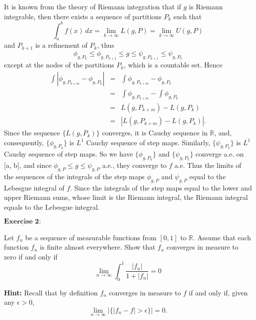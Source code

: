 \documentclass[12pt,a4paper]{ctexart}
\begin{document}
It is known from the theory of Riemann integration that if $g$ is Riemann integrable, then there exists a sequence of partitions $P_{k}$ such that
\begin{equation*}
    \int_{a}^{b} f(x) \, d x = \lim_{k \to \infty} L(g, P) = \lim_{k \to \infty} U(g, P)
\end{equation*}
and $P_{k+1}$ is a refinement of $P_{k}$, thus
\begin{equation*}
    \phi_{g, P_{k}} \leq \phi_{g, P_{k+1}}  \leq g \leq \psi_{g, P_{k+1}} \leq \psi_{g, P_{k}} 
\end{equation*}
except at the nodes of the partitions $P_{k}$, which is a countable set. Hence
\begin{eqnarray*}
    \int |\phi_{g, P_{k+m}} - \phi_{g, P_{k}} | & = & \int \phi_{g, P_{k+m}} - \phi_{g, P_{k}}   \\
    & = & \int \phi_{g, P_{k+m}} - \int \phi_{g, P_{k}}  \\
    & = & L(g, P_{k+m}) - L(g, P_{k}) \\
    & = & |L(g, P_{k+m}) - L(g, P_{k})|.
\end{eqnarray*}
Since the sequence $\{ L (g, P_{k}) \}$ converges, it is Cauchy sequence in $\mathbb{R}$, and, consequently, $\{\phi_{g, P_{k}} \}$ is $L^{1}$ Cauchy sequence of step maps. Similarly,  $\{\psi_{g, P_{k}} \}$ is $L^{1}$ Cauchy sequence of step maps. So we have $\{\phi_{g, P_{k}} \}$ and $\{\psi_{g, P_{k}} \}$ converge a.e. on [a, b], and since $\phi_{g, P} \leq g \leq \psi_{g, P}$ a.e., they converge to $f$ a.e. Thus the limits of the sequences of the integrals of the step maps $\phi_{g, P}$ and $\psi_{g, P}$ equal to the Lebesgue integral of $f$. Since the integrals of the step maps equal to the lower and upper Riemann sums, whose limit is the Riemann integral, the Riemann integral equals to the Lebesgue integral.


\newpage

$\underline{\textbf{Exercise 2:}}$

Let $f_{n}$ be a sequence of measurable functions from $[0, 1]$ to $\mathbb{R}$. Assume that each function $f_{n}$ is finite almost everywhere. Show that $f_{n}$ converges in measure to zero if and only if 
\begin{equation*}
    \lim_{n \to \infty} \int_{0}^{1} \frac{|f_{n}|}{1 + |f_{n}|} = 0
\end{equation*}

\textbf{Hint:} Recall that by definition $f_{n}$ converges in measure to $f$ if and only if, given any $\epsilon > 0$,
\begin{equation*}
    \lim_{n \to \infty} |\{ |f_{n} - f| > \epsilon \}| = 0.
\end{equation*}
\end{document}
